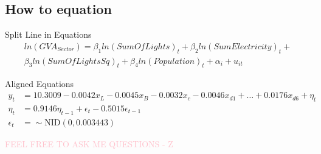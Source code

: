 \fi


\subsection*{How to equation}

Split Line in Equations
\begin{equation}
\begin{split}
\label{eqn:natsec}
ln(GVA_{Sector}) = \beta_1ln(SumOfLights)_{t}+\beta_2ln(SumElectricity)_t +\\ \beta_3ln(SumOfLightsSq)_{t} + \beta_4ln(Population)_{t} +
\alpha_i + u_{it}
\end{split}
\end{equation}

Aligned Equations
$$
\begin{aligned}
y_t &= 10.3009 -0.0042x_L - 0.0045x_B - 0.0032x_c -0.0046x_{d1} + \ldots + 0.0176x_{d6} + \eta_t \\
\eta_t &= 0.9146\eta_{t-1} + \epsilon_t -0.5015\epsilon_{t-1}\\
\epsilon_t &= \sim \text{NID}(0,0.003443)
\end{aligned}
$$

{\Huge \textcolor{pink}{FEEL FREE TO ASK ME QUESTIONS - Z}}